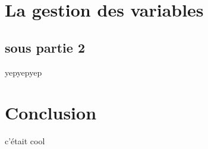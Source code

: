 \documentclass[12pt]{article}
\begin{document}
\newpage

\section{La gestion des variables}
\subsection{sous partie 2}
yepyepyep

\newpage

\section{Conclusion}
c'était cool
\end{document}
